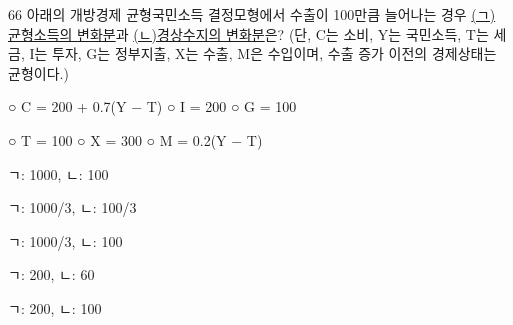 \begin{question}{66}
아래의 개방경제 균형국민소득 결정모형에서 수출이 100만큼 늘어나는 경우 \uline{(ㄱ) 균형소득의 변화분}과 \uline{(ㄴ)경상수지의 변화분}은? (단, C는 소비, Y는 국민소득, T는 세금, I는 투자, G는 정부지출, X는 수출, M은 수입이며, 수출 증가 이전의 경제상태는 균형이다.)
\begin{framedtext}
○ C = 200 + 0.7(Y $-$ T) \hfill ○ I = 200 \hfill ○ G = 100 \par
○ T = 100 \hspace{4.2em} ○ X = 300 \hfill ○ M = 0.2(Y $-$ T) \hfill\mbox{}
\end{framedtext}
\begin{choices}
  \item ㄱ: 1000, ㄴ: 100
  \item ㄱ: 1000/3, ㄴ: 100/3
  \item ㄱ: 1000/3, ㄴ: 100
  \item ㄱ: 200, ㄴ: 60
  \item ㄱ: 200, ㄴ: 100
\end{choices}
\end{question}
